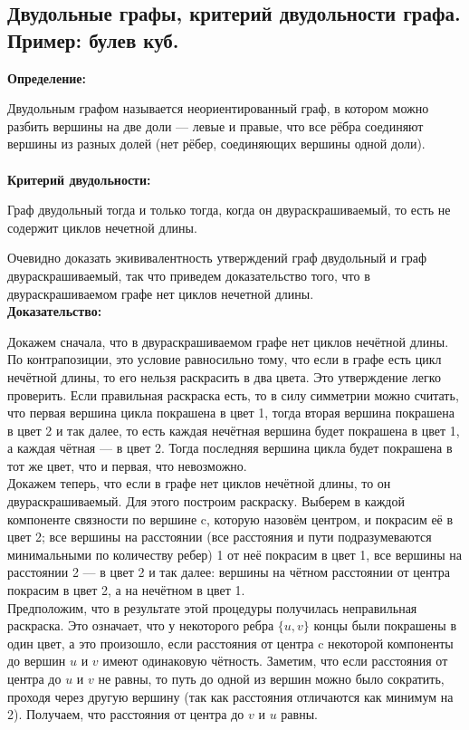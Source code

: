 \subsection{Двудольные графы, критерий двудольности графа. Пример: булев куб.}

\textbf{Определение:}

Двудольным графом называется неориентированный граф, в котором можно разбить вершины на две доли — левые и правые, что все рёбра соединяют вершины из
разных долей (нет рёбер, соединяющих вершины одной доли). \\ \\ 

\noindent \textbf{Критерий двудольности:}

Граф двудольный тогда и только тогда, когда он двураскрашиваемый, то есть не содержит циклов нечетной длины.

Очевидно доказать экививалентность утверждений граф двудольный и граф двураскрашиваемый, так что приведем доказательство того, что в двураскрашиваемом графе нет циклов нечетной длины. \\

\noindent \textbf{Доказательство:}

Докажем сначала, что в двураскрашиваемом графе нет циклов нечётной длины.
По контрапозиции, это условие равносильно тому, что если в графе есть цикл нечётной длины, то
его нельзя раскрасить в два цвета. Это утверждение легко проверить. Если правильная раскраска
есть, то в силу симметрии можно считать, что первая вершина цикла покрашена в цвет 1, тогда
вторая вершина покрашена в цвет 2 и так далее, то есть каждая нечётная вершина будет покрашена
в цвет 1, а каждая чётная — в цвет 2. Тогда последняя вершина цикла будет покрашена в тот же
цвет, что и первая, что невозможно. \\ 

Докажем теперь, что если в графе нет циклов нечётной длины, то он двураскрашиваемый. Для
этого построим раскраску. Выберем в каждой компоненте связности по вершине c, которую назовём
центром, и покрасим её в цвет 2; все вершины на расстоянии (все расстояния и пути подразумеваются минимальными по количеству ребер) 1 от неё покрасим в цвет 1, все вершины
на расстоянии 2 — в цвет 2 и так далее: вершины на чётном расстоянии от центра покрасим в цвет
2, а на нечётном в цвет 1. \\

Предположим, что в результате этой процедуры получилась неправильная раскраска. Это означает, что у некоторого ребра $\{u, v\}$ концы были покрашены в один цвет, а это произошло, если расстояния от центра c некоторой компоненты до вершин $u$ и $v$ имеют одинаковую чётность. Заметим, что если расстояния от центра до $u$ и $v$ не равны, то путь до одной из вершин можно было сократить, проходя через другую вершину (так как расстояния отличаются как минимум на 2). Получаем, что расстояния от центра до $v$ и $u$ равны. \\

